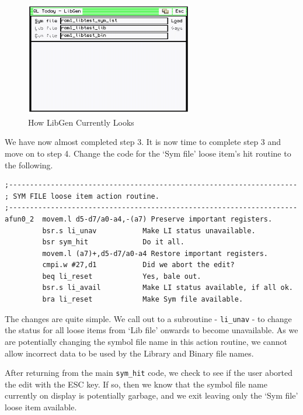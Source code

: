 \begin{figure}[h]
\center
\includegraphics[width=0.65\textwidth]{Content/images/libgen_2.png}
\caption{How LibGen Currently Looks}
\label{fig:HowLibGenCurrentlyLooks}
\end{figure}


We have now almost completed step 3. It is now time to complete step
    3 and move on to step 4. Change the code for the `Sym file' loose item's
    hit routine to the following.

\begin{lstlisting}[firstnumber=1,]
;---------------------------------------------------------------------
; SYM FILE loose item action routine.
;---------------------------------------------------------------------
afun0_2  movem.l d5-d7/a0-a4,-(a7) Preserve important registers.
         bsr.s li_unav           Make LI status unavailable.
         bsr sym_hit             Do it all.
         movem.l (a7)+,d5-d7/a0-a4 Restore important registers.
         cmpi.w #27,d1           Did we abort the edit?
         beq li_reset            Yes, bale out.
         bsr.s li_avail          Make LI status available, if all ok.
         bra li_reset            Make Sym file available.
\end{lstlisting}

The changes are quite simple. We call out to a subroutine -{}
 \texttt{li\_unav} -{} to change the status for all loose items
    from `Lib file' onwards to become unavailable. As we are potentially
    changing the symbol file name in this action routine, we cannot allow
    incorrect data to be used by the Library and Binary file names.

After returning from the main \texttt{sym\_hit} code, we
    check to see if the user aborted the edit with the ESC key. If so, then we
    know that the symbol file name currently on display is potentially
    garbage, and we exit leaving only the `Sym file' loose item
    available.

